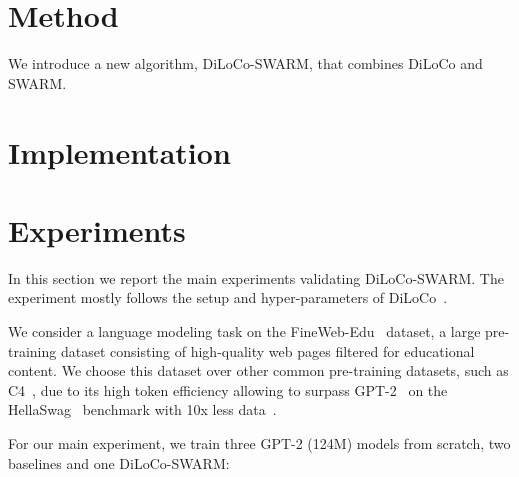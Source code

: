 \documentclass{article}
\begin{document}
% 

\section{Method}

We introduce a new algorithm, DiLoCo-SWARM, that combines DiLoCo and SWARM.


\section{Implementation}


\section{Experiments}

In this section we report the main experiments validating DiLoCo-SWARM. The experiment
mostly follows the setup and hyper-parameters of DiLoCo~\cite{douillard2023}.

We consider a language modeling task on the FineWeb-Edu~\cite{penedo2024}
dataset, a large pre-training dataset consisting of high-quality web pages
filtered for educational content. We choose this dataset over other common
pre-training datasets, such as C4~\cite{}, due to its high token efficiency
allowing to surpass GPT-2~\cite{radford2019} on the HellaSwag~\cite{zellers2019}
benchmark with 10x less data~\cite{karpathy2024}.

For our main experiment, we train three GPT-2 (124M) models from scratch, two
baselines and one DiLoCo-SWARM:
\end{document}

